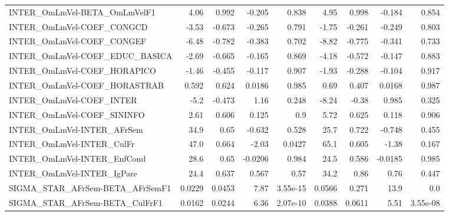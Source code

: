 \begin{tabular}{lrrrrrrrr}
INTER\_OmLmVel-BETA\_OmLmVelF1          &        4.06 &        0.992 &  -0.205 &    0.838 &       4.95 &       0.998 &       -0.184 &         0.854 \\
INTER\_OmLmVel-COEF\_CONGCD             &       -3.53 &       -0.673 &  -0.265 &    0.791 &      -1.75 &      -0.261 &       -0.249 &         0.803 \\
INTER\_OmLmVel-COEF\_CONGEF             &       -6.48 &       -0.782 &  -0.383 &    0.702 &      -8.82 &      -0.775 &       -0.341 &         0.733 \\
INTER\_OmLmVel-COEF\_EDUC\_BASICA        &       -2.69 &       -0.665 &  -0.165 &    0.869 &      -4.18 &      -0.572 &       -0.147 &         0.883 \\
INTER\_OmLmVel-COEF\_HORAPICO           &       -1.46 &       -0.455 &  -0.117 &    0.907 &      -1.93 &      -0.288 &       -0.104 &         0.917 \\
INTER\_OmLmVel-COEF\_HORASTRAB          &       0.592 &        0.624 &  0.0186 &    0.985 &       0.69 &       0.407 &       0.0168 &         0.987 \\
INTER\_OmLmVel-COEF\_INTER              &        -5.2 &       -0.473 &    1.16 &    0.248 &      -8.24 &       -0.38 &        0.985 &         0.325 \\
INTER\_OmLmVel-COEF\_SININFO            &        2.61 &        0.606 &   0.125 &      0.9 &       5.72 &       0.625 &        0.118 &         0.906 \\
INTER\_OmLmVel-INTER\_AFrSem            &        34.9 &         0.65 &  -0.632 &    0.528 &       25.7 &       0.722 &       -0.748 &         0.455 \\
INTER\_OmLmVel-INTER\_CulFr             &        47.0 &        0.664 &   -2.03 &   0.0427 &       65.1 &       0.605 &        -1.38 &         0.167 \\
INTER\_OmLmVel-INTER\_EnfCond           &        28.6 &         0.65 & -0.0206 &    0.984 &       24.5 &       0.586 &      -0.0185 &         0.985 \\
INTER\_OmLmVel-INTER\_IgPare            &        24.4 &        0.637 &   0.567 &     0.57 &       34.2 &        0.86 &         0.76 &         0.447 \\
SIGMA\_STAR\_AFrSem-BETA\_AFrSemF1       &      0.0229 &       0.0453 &    7.87 & 3.55e-15 &     0.0566 &       0.271 &         13.9 &           0.0 \\
SIGMA\_STAR\_AFrSem-BETA\_CulFrF1        &      0.0162 &       0.0244 &    6.36 & 2.07e-10 &     0.0388 &      0.0611 &         5.51 &      3.55e-08 \\

\end{tabular}
